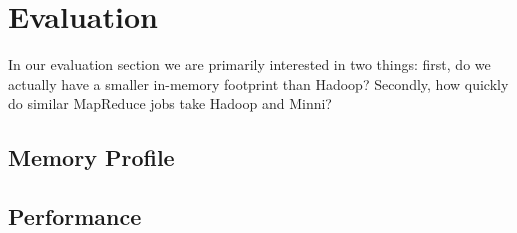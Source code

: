 \documentclass[10pt,letter,final,article,twocolumn]{article} %
\newcommand{\rpc}[1]{\emph{#1}}
\begin{document}
%
%
%



\section{Evaluation}
In our evaluation section we are primarily interested in two things: first, do we actually have a smaller in-memory footprint than Hadoop? Secondly, how quickly do similar MapReduce jobs take Hadoop and Minni?
\subsection{Memory Profile}
\subsection{Performance}




\end{document}
